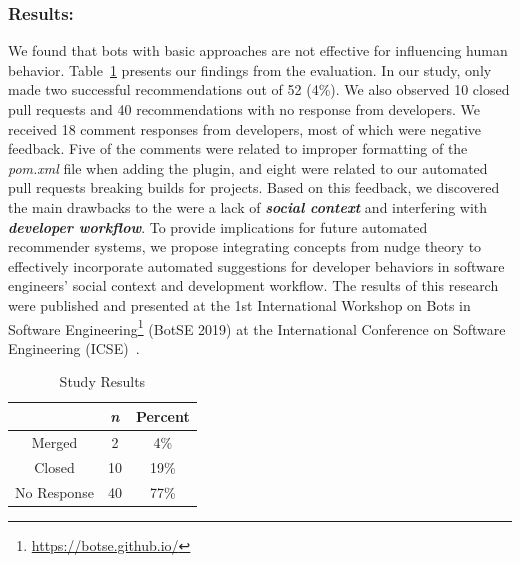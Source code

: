 \subsubsection{Results:} 

We found that bots with basic approaches are not effective for influencing human behavior. Table~\ref{tab:sorry_results} presents our findings from the evaluation. In our study, \tele only made two successful recommendations out of 52 (4\%). We also observed 10 closed pull requests and 40 recommendations with no response from developers. We received 18 comment responses from developers, most of which were negative feedback. Five of the comments were related to improper formatting of the \textit{pom.xml} file when adding the \EP plugin, and eight were related to our automated pull requests breaking builds for projects. Based on this feedback, we discovered the main drawbacks to the \tele were a lack of \textit{\textbf{social context}} and interfering with \textit{\textbf{developer workflow}}. To provide implications for future automated recommender systems, we propose integrating concepts from nudge theory to effectively incorporate automated suggestions for developer behaviors in software engineers' social context and development workflow. The results of this research were published and presented at the 1st International Workshop on Bots in Software Engineering\footnote{\url{https://botse.github.io/}} (BotSE 2019) at the International Conference on Software Engineering (ICSE)~\cite{BotSE}.

\begin{table}[H]
\centering
\begin{tabular}{ |c|c|c| } \hline
  & \textit{\textbf{n}} & \textbf{Percent} \\ \hline
 Merged & 2 & 4\% \\ \hline 
 Closed & 10 & 19\% \\ \hline
 No Response & 40 & 77\%\\ \hline 
\end{tabular}
\caption{\sorry Study Results}
\label{tab:sorry_results}
\end{table}

